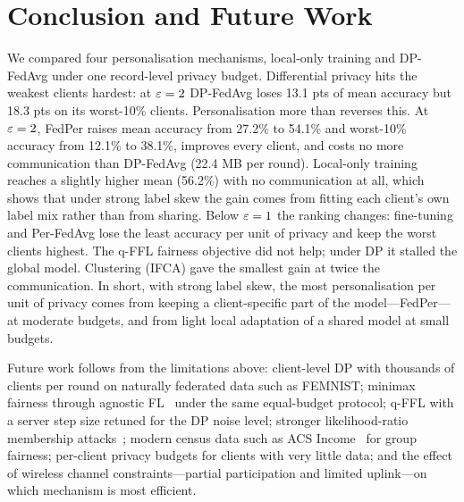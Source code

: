 \section{Conclusion and Future Work}\label{sec:conclusion}
We compared four personalisation mechanisms, local-only training and DP-FedAvg under one record-level privacy
budget. Differential privacy hits the weakest clients hardest: at $\varepsilon=2$ DP-FedAvg loses 13.1 pts of mean accuracy
but 18.3 pts on its worst-10\% clients. Personalisation more than reverses this. At $\varepsilon=2$, FedPer raises mean
accuracy from 27.2\% to 54.1\% and worst-10\% accuracy from 12.1\% to 38.1\%, improves every client, and costs no more
communication than DP-FedAvg (22.4 MB per round). Local-only training reaches a slightly higher mean (56.2\%) with
no communication at all, which shows that under strong label skew the gain comes from fitting each client's own
label mix rather than from sharing. Below $\varepsilon=1$ the ranking changes: fine-tuning and Per-FedAvg lose the least
accuracy per unit of privacy and keep the worst clients highest. The q-FFL fairness objective did not help; under DP
it stalled the global model. Clustering (IFCA) gave the smallest gain at twice the communication. In short, with
strong label skew, the most personalisation per unit of privacy comes from keeping a client-specific part of the
model---FedPer---at moderate budgets, and from light local adaptation of a shared model at small budgets.

Future work follows from the limitations above: client-level DP with thousands of clients per round on naturally
federated data such as FEMNIST; minimax fairness through agnostic FL~\cite{mohri2019agnostic} under the same
equal-budget protocol; q-FFL with a server step size retuned for the DP noise level; stronger likelihood-ratio membership
attacks~\cite{carlini2022membership}; modern census
data such as ACS Income~\cite{ding2021retiring} for group fairness; per-client privacy budgets for clients with very
little data; and the effect of wireless channel constraints---partial participation and limited uplink---on which
mechanism is most efficient.
